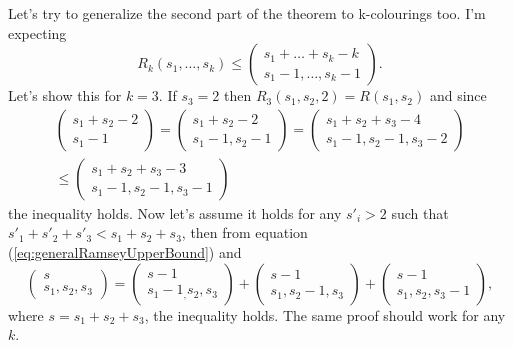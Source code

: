 Let's try to generalize the second part of the theorem to k-colourings too.
I'm expecting
\begin{equation}
    R_k(s_1,\dots,s_k) \leq
    \left(
    \begin{matrix}
        s_1+\dots+s_k-k \\
        s_1-1,\dots,s_k-1
    \end{matrix}
    \right) .
\end{equation}
Let's show this for $k=3$. If $s_3 = 2$ then $R_3(s_1,s_2,2) = R(s_1,s_2)$ and since
\begin{multline}
    \left(
    \begin{matrix}
        s_1+s_2-2 \\
        s_1-1
    \end{matrix}
    \right) =
    \left(
    \begin{matrix}
        s_1+s_2-2 \\
        s_1-1,s_2-1
    \end{matrix}
    \right)
    =
    \left(
    \begin{matrix}
        s_1+s_2+s_3-4 \\
        s_1-1,s_2-1,s_3-2
    \end{matrix}
    \right) \\
    \leq
    \left(
    \begin{matrix}
        s_1+s_2+s_3-3 \\
        s_1-1,s_2-1,s_3-1
    \end{matrix}
    \right)
    \nonumber
\end{multline}
the inequality holds.
Now let's assume it holds for any $s'_i > 2$ such that $s'_1+s'_2+s'_3 < s_1+s_2+s_3$, then from equation (\ref{eq:generalRamseyUpperBound}) and
\begin{equation}
    \left(
    \begin{matrix}
        s \\
        s_1,s_2,s_3
    \end{matrix}
    \right) =
    \left(
    \begin{matrix}
        s-1 \\
        s_1-1_,s_2,s_3
    \end{matrix}
    \right) +
    \left(
    \begin{matrix}
        s-1 \\
        s_1,s_2-1,s_3
    \end{matrix}
    \right) +
    \left(
    \begin{matrix}
        s-1 \\
        s_1,s_2,s_3-1
    \end{matrix}
    \right) , \nonumber
\end{equation}
where $s=s_1+s_2+s_3$, the inequality holds.
The same proof should work for any $k$.

